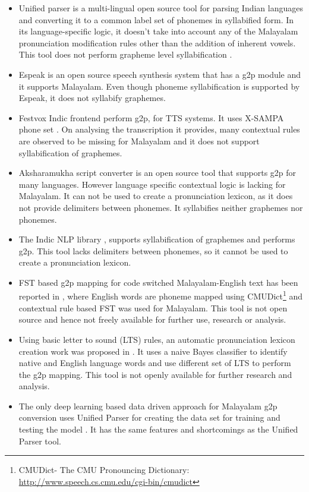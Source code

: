 \begin{itemize}
	\item Unified parser \cite{baby2016unified} is a multi-lingual open source tool for
	      parsing Indian languages and converting it to a common label set of phonemes in
	      syllabified form. In its language-specific logic, it doesn't take into account
	      any of the Malayalam pronunciation modification rules other than the addition
	      of inherent vowels. This tool does not perform  grapheme level syllabification .
	\item Espeak \cite{duddington2012espeak} is an open source speech synthesis system
	      that has a \gls{g2p} module and it supports Malayalam. Even though phoneme
	      syllabification is supported by Espeak, it does not syllabify graphemes.
	\item Festvox Indic frontend perform  \gls{g2p}, for TTS systems. It uses X-SAMPA phone set
	      \cite{parlikar2016festvox}. On analysing the transcription it provides, many
	      contextual rules are observed to be missing for Malayalam and it does not
	      support syllabification of graphemes.
	\item Aksharamukha \cite{aksharamukha} script converter is an open source tool that
	      supports  \gls{g2p} for many languages. However language specific contextual logic is
	      lacking for Malayalam. It can not be used to create a pronunciation lexicon, as
	      it does not provide delimiters between phonemes. It syllabifies neither
	      graphemes nor phonemes.
	\item The Indic NLP library \cite{kunchukuttan2020indicnlp}, supports syllabification of graphemes and performs  \gls{g2p}. This tool lacks delimiters between phonemes, so 
	      it cannot be used to create a pronunciation lexicon. 
       \item FST based  \gls{g2p}
	      mapping for code switched Malayalam-English text has been reported in
	      \cite{manghat2020malayalam}, where English words are phoneme mapped using
	      CMUDict\footnote{CMUDict- The CMU Pronouncing Dictionary:
		      \url{http://www.speech.cs.cmu.edu/cgi-bin/cmudict}} and contextual rule based
	      FST was used for Malayalam. This tool is not open source and hence not freely
	      available for further use, research or analysis. 
       \item Using basic letter to
	      sound (LTS) rules, an automatic pronunciation lexicon creation work was
	      proposed in \cite{aswathy2014improving}. It uses a naive Bayes classifier to
	      identify native and English language words and use different set of LTS to
	      perform the  \gls{g2p} mapping. This tool is not openly available for further research
	      and analysis.
	\item The only deep learning based data driven approach for Malayalam  \gls{g2p} conversion
	      uses Unified Parser for creating the data set for training and testing the
	      model \cite{Priyamvada_2021}. It has the same features and shortcomings as the
	      Unified Parser tool.
\end{itemize}


